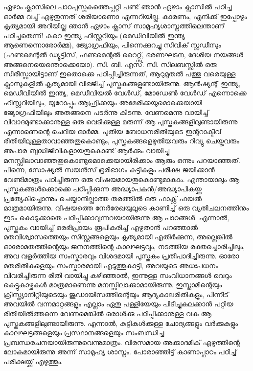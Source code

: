 \vskip 2pt

ഏഴാം ക്ലാസിലെ പാഠപുസ്തകത്തെപ്പറ്റി പണ്ട് ഞാന്‍ ഏഴാം ക്ലാസില്‍ പഠിച്ച ഓര്‍മ്മ വച്ച് എഴുതുന്നത് ശരിയാണൊ എന്നറിയില്ല. കാരണം,
എനിക്ക് ഇപ്പോഴും കൃത്യമായി അറിയില്ല ഞാന്‍ ഏഴാം ക്ലാസ് സാമൂഹ്യശാസ്ത്രത്തിലെന്താണ് പഠിച്ചതെന്ന്! കുറെ ഇന്ത്യ ഹിസ്റ്ററിയും 
(മെഡിവിയില്‍ ഇന്ത്യ ആണെന്നൊരോര്‍മ്മ), ജ്യോഗ്രഫിയും, പിന്നെക്കുറച്ചു സിവിക് സ്റ്റഡീസും (ഫണ്ടമെന്റല്‍ ഡ്യൂട്ടിസ്, ഫണ്ടമെന്റല്‍ റൈറ്റ്സ്, 
ഭരണഘടന, ദേശീയ നയങ്ങള്‍ അങ്ങനെയെന്തൊക്കെയോ). സി. ബി. എസ്. സി. സിലബസ്സില്‍ ഒരു സീരീസ്സായിട്ടാണ് ഇതൊക്കെ പഠിപ്പിച്ചിരുന്നത്, 
ആറുമുതല്‍ പത്തു വരെയുള്ള ക്ലാസുകളില്‍ കൃത്യമായി വിഭജിച്ച് പുസ്തകങ്ങളുണ്ടായിരുന്നു. ആന്‍ഷ്യന്റ് ഇന്ത്യ, മെഡീവിയില്‍ ഇന്ത്യ, മെഡീവിയല്‍ വേള്‍ഡ്, 
മോഡേണ്‍ വേള്‍ഡ് എന്നൊക്കെ ഹിസ്റ്ററിയിലും, യൂറോപ്പും ആഫ്രിക്കയും അമേരിക്കയുമൊക്കെയായി ജ്യോഗ്രഫിയിലും അതങ്ങനെ പടര്‍ന്നു കിടന്നു. 
വേണമെന്നു വായിച്ച് വിവാദമുണ്ടാക്കാനുള്ള ഒരു വെടിക്കുള്ള മരുന്ന് ആ പുസ്തകങ്ങളിലുണ്ടായിരുന്നു എന്നാണെന്റെ ചെറിയ ഓര്‍മ്മ. പുതിയ ബോധനരീതിയുടെ 
ഇന്ററാക്ടീവ് രീതിയിലുള്ളതാവാഞ്ഞതുകൊണ്ടും, പുസ്തകങ്ങളെഴുതിയവരും റിവ്യു ചെയ്തവരും അപാര ബുദ്ധിജീവികളായതുകൊണ്ട് ആര്‍ക്കും വായിച്ചു 
മനസ്സിലാവാഞ്ഞതുകൊണ്ടുമൊക്കെയായിരിക്കാം ആരും ഒന്നും പറയാഞ്ഞത്. പിന്നെ, സോഷ്യല്‍ സയന്‍സ് ഭൂരിഭാഗം കുട്ടികളും പരീക്ഷ ജയിക്കാന്‍ 
വേണ്ടിമാത്രം പഠിച്ചിരുന്ന ഒരു വിഷയമായതുകൊണ്ടുമാകാം. എന്തായാലും ആ പുസ്തകങ്ങള്‍ക്കൊക്കെ പഠിപ്പിക്കുന്ന അദ്ധ്യാപകന്‍/അദ്ധ്യാപികയ്ക്കു പ്രത്യേകിച്ചൊന്നും 
ചെയ്യാനില്ലാത്ത തരത്തില്‍ ഒരു ഫാക്റ്റ് ഫയല്‍ മാത്രമായിരുന്നു. വിഷയത്തെ നേര്‍രേഖയുലൂടെ കാണിച്ച് ഒരു വ്യതിചലനത്തിനും ഇടം കൊടുക്കാതെ 
പഠിപ്പിക്കാവുന്നവയായിരുന്നു ആ പാഠങ്ങള്‍. എന്നാല്‍, പുസ്തകം വായിച്ച് ഒരഭിപ്രായം രൂപീകരിച്ച് എഴുതാന്‍ പറഞ്ഞാല്‍ മതവിശ്വാസത്തെയും സിസ്റ്റങ്ങളെയും 
കൃത്യമായി എതിര്‍ക്കുന്ന, അല്ലെങ്കില്‍ ഓരോമതത്തിന്റെയും ജനനത്തിന്റെ കാലഘട്ടവും, നടത്തിയ രക്തച്ചൊരിച്ചിലും, അവ വളര്‍ത്തിയ സംസ്കാരവും വിശദമായി 
പുസ്തകം പ്രതിപാദിച്ചിരുന്നു. ഓരോ മതരീതികളെയും സംസ്കാരമായി എടുത്തുകാട്ടി, അവയുടെ അധഃപധനം വിവരിച്ചിരുന്ന രീതി വായിച്ചു കഴിഞ്ഞാല്‍, ഇന്നുള്ള 
സംവിധാനങ്ങള്‍ വെറും കെട്ടുകാഴ്ചകള്‍ മാത്രമാണെന്നു മനസ്സിലാക്കാമായിരുന്നു. ഇസ്ലാമിന്റെയും ക്രിസ്ത്യാനിറ്റിയുടെയും ജുഡായിസത്തിന്റെയും ആദ്യകാലരീതികളും, 
പിന്നീട് അവയില്‍ വന്നമാറ്റങ്ങളും എല്ലാം ഏതു പള്ളിയേയും പിടിച്ചുകുലക്കാന്‍ പറ്റിയ രീതിയില്‍ത്തന്നെ വേണമെങ്കില്‍ ഒരാള്‍ക്കു പഠിപ്പിക്കാനുള്ള വക ആ 
പുസ്തകങ്ങളിലുണ്ടായിരുന്നു. എന്നാല്‍, കുട്ടികള്‍ക്കുള്ള ചോദ്യങ്ങളും വര്‍ക്കുകളും കാലഘട്ടങ്ങളെയും പ്രസ്ഥാനങ്ങളെയും സംബന്ധിച്ച പ്രബന്ധരചനയായിരുന്നുവെന്നുമാത്രം. 
വിരസമായ അക്കാദമിക് എഴുത്തിന്റെ ലോകമായിരുന്നു അന്ന് സാമൂഹ്യ ശാസ്ത്രം. പോരാഞ്ഞിട്ട് കാണാപ്പാഠം പഠിച്ച് പരീക്ഷയ്ക്ക് എഴുത്തും.

